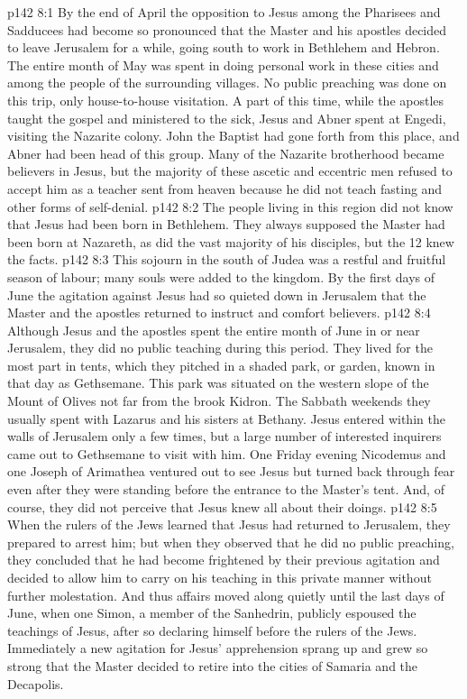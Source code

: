 \vs p142 8:1 By the end of April the opposition to Jesus among the Pharisees and Sadducees had become so pronounced that the Master and his apostles decided to leave Jerusalem for a while, going south to work in Bethlehem and Hebron. The entire month of May was spent in doing personal work in these cities and among the people of the surrounding villages. No public preaching was done on this trip, only house\hyp{}to\hyp{}house visitation. A part of this time, while the apostles taught the gospel and ministered to the sick, Jesus and Abner spent at Engedi, visiting the Nazarite colony. John the Baptist had gone forth from this place, and Abner had been head of this group. Many of the Nazarite brotherhood became believers in Jesus, but the majority of these ascetic and eccentric men refused to accept him as a teacher sent from heaven because he did not teach fasting and other forms of self\hyp{}denial.
\vs p142 8:2 The people living in this region did not know that Jesus had been born in Bethlehem. They always supposed the Master had been born at Nazareth, as did the vast majority of his disciples, but the 12 knew the facts.
\vs p142 8:3 This sojourn in the south of Judea was a restful and fruitful season of labour; many souls were added to the kingdom. By the first days of June the agitation against Jesus had so quieted down in Jerusalem that the Master and the apostles returned to instruct and comfort believers.
\vs p142 8:4 Although Jesus and the apostles spent the entire month of June in or near Jerusalem, they did no public teaching during this period. They lived for the most part in tents, which they pitched in a shaded park, or garden, known in that day as Gethsemane. This park was situated on the western slope of the Mount of Olives not far from the brook Kidron. The Sabbath weekends they usually spent with Lazarus and his sisters at Bethany. Jesus entered within the walls of Jerusalem only a few times, but a large number of interested inquirers came out to Gethsemane to visit with him. One Friday evening Nicodemus and one Joseph of Arimathea ventured out to see Jesus but turned back through fear even after they were standing before the entrance to the Master’s tent. And, of course, they did not perceive that Jesus knew all about their doings.
\vs p142 8:5 When the rulers of the Jews learned that Jesus had returned to Jerusalem, they prepared to arrest him; but when they observed that he did no public preaching, they concluded that he had become frightened by their previous agitation and decided to allow him to carry on his teaching in this private manner without further molestation. And thus affairs moved along quietly until the last days of June, when one Simon, a member of the Sanhedrin, publicly espoused the teachings of Jesus, after so declaring himself before the rulers of the Jews. Immediately a new agitation for Jesus’ apprehension sprang up and grew so strong that the Master decided to retire into the cities of Samaria and the Decapolis.
\quizlink
